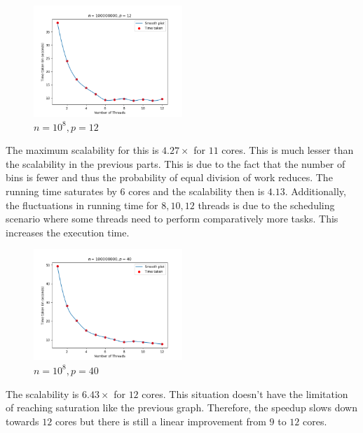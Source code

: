 \documentclass[11pt]{article}
\begin{document}
\begin{figure}[H]
	\begin{center}
		\includegraphics[width=0.5\textwidth]{outputs/1e8_12_t12.png}
	\end{center}
	\caption{$n = 10^8, p = 12$}
	\label{fig:1e8_12}
\end{figure}
The maximum scalability for this is $4.27\times$ for $11$ cores. This is much lesser than the scalability in the previous parts. This is due to the fact that the number of bins is fewer and thus the probability of equal division of work reduces. The running time saturates by $6$ cores and the scalability then is $4.13$. Additionally, the fluctuations in running time for $8, 10, 12$ threads is due to the scheduling scenario where some threads need to perform comparatively more tasks. This increases the execution time.

\begin{figure}[H]
	\begin{center}
		\includegraphics[width=0.5\textwidth]{outputs/1e8_40_t12.png}
	\end{center}
	\caption{$n = 10^8, p = 40$}
	\label{fig:1e8_40}
\end{figure}
The scalability is $6.43\times$ for $12$ cores. This situation doesn't have the limitation of reaching saturation like the previous graph. Therefore, the speedup slows down towards $12$ cores but there is still a linear improvement from $9$ to $12$ cores.
\end{document}
